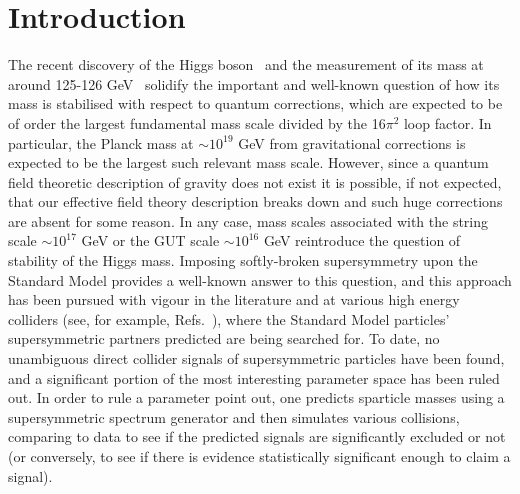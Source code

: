 \documentclass[final,3p,times,pdflatex]{elsarticle}
\begin{document}
\section{Introduction}

The recent discovery of the Higgs boson~\cite{Aad:2012tfa,Chatyrchan:2012ufa}
and the measurement of its mass at around 
125-126 GeV~\cite{ATLAS-CONF-2013-014} solidify the important and well-known
question of how its mass is 
stabilised with respect to quantum corrections, which are expected to be of
order the largest fundamental mass scale divided by the 16$\pi^2$ loop factor.
In particular, the Planck mass at $\sim 10^{19}$ GeV from gravitational
corrections is expected to be the largest such relevant mass scale. 
However, since a quantum field theoretic description of gravity does not
exist it is possible, if not expected, that our effective field theory
description breaks down and such huge corrections are absent
for some reason. 
In any case, mass scales associated with the string scale $\sim 10^{17}$ GeV
or the GUT scale $\sim 10^{16}$ GeV reintroduce the question of stability of
the Higgs mass.  
Imposing softly-broken supersymmetry upon the Standard Model provides a
well-known answer to this question, and this approach has been pursued
with vigour in the literature and at various high energy colliders (see, for
example, Refs.~\cite{Aad:2013wta,Chatrchyan:2014lfa}), where 
the Standard Model particles' supersymmetric partners predicted are being
searched for. To date, no unambiguous direct collider signals of
supersymmetric particles have been found, and a significant portion of the
most interesting parameter space has been ruled out. 
In order to rule a parameter point out, one predicts sparticle masses using
a supersymmetric spectrum generator and then simulates various collisions,
comparing to data to see if the predicted signals are significantly excluded
or not (or conversely, to see if there is evidence statistically significant
enough to claim a signal).
\end{document}
